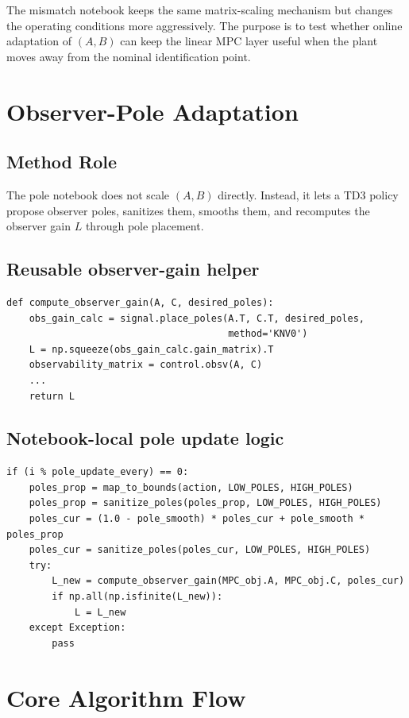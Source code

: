 \documentclass[11pt]{article}
\begin{document}
The mismatch notebook keeps the same matrix-scaling mechanism but changes the
operating conditions more aggressively. The purpose is to test whether online
adaptation of $(A, B)$ can keep the linear MPC layer useful when the plant moves
away from the nominal identification point.

\section*{Observer-Pole Adaptation}

\subsection*{Method Role}

The pole notebook does not scale $(A, B)$ directly. Instead, it lets a TD3
policy propose observer poles, sanitizes them, smooths them, and recomputes the
observer gain $L$ through pole placement.

\subsection*{Reusable observer-gain helper}

\begin{lstlisting}
def compute_observer_gain(A, C, desired_poles):
    obs_gain_calc = signal.place_poles(A.T, C.T, desired_poles,
                                       method='KNV0')
    L = np.squeeze(obs_gain_calc.gain_matrix).T
    observability_matrix = control.obsv(A, C)
    ...
    return L
\end{lstlisting}

\subsection*{Notebook-local pole update logic}

\begin{lstlisting}
if (i % pole_update_every) == 0:
    poles_prop = map_to_bounds(action, LOW_POLES, HIGH_POLES)
    poles_prop = sanitize_poles(poles_prop, LOW_POLES, HIGH_POLES)
    poles_cur = (1.0 - pole_smooth) * poles_cur + pole_smooth * poles_prop
    poles_cur = sanitize_poles(poles_cur, LOW_POLES, HIGH_POLES)
    try:
        L_new = compute_observer_gain(MPC_obj.A, MPC_obj.C, poles_cur)
        if np.all(np.isfinite(L_new)):
            L = L_new
    except Exception:
        pass
\end{lstlisting}

\section*{Core Algorithm Flow}
\end{document}
